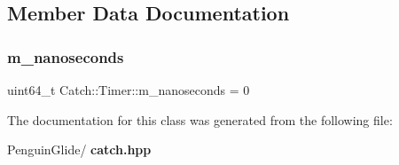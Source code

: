 \subsection{Member Data Documentation}
\mbox{\label{class_catch_1_1_timer_ac13c1ef867cc3b9f942032d5ed79c2a7}} 
\subsubsection{m\_nanoseconds}
{\footnotesize\ttfamily uint64\+\_\+t Catch\+::\+Timer\+::m\+\_\+nanoseconds = 0\hspace{0.3cm}{\ttfamily [private]}}



The documentation for this class was generated from the following file\+:\begin{DoxyCompactItemize}
\item 
Penguin\+Glide/\textbf{ catch.\+hpp}\end{DoxyCompactItemize}

